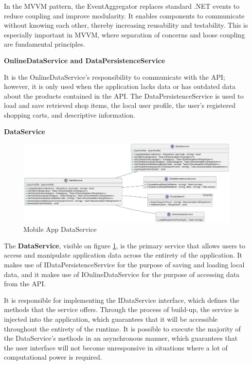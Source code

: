 In the MVVM pattern, the EventAggregator replaces standard .NET events to reduce coupling and improve modularity. It enables components to communicate without knowing each other, thereby increasing reusability and testability. This is especially important in MVVM, where separation of concerns and loose coupling are fundamental principles.

\noindent\textbf{OnlineDataService and DataPersistenceService}

It is the OnlineDataService's responsibility to communicate with the API; however, it is only used when the application lacks data or has outdated data about the products contained in the API. The DataPersistenceService is used to load and save retrieved shop items, the local user profile, the user's registered shopping carts, and descriptive information.

\noindent\textbf{DataService}

\begin{figure}[H]
	\centering
	\includegraphics[width=1\linewidth]{img/app_dataservice.png}
	\caption{Mobile App DataService}
	\label{fig:appdataservice}
\end{figure}

The \textbf{DataService}, visible on figure \ref{fig:appdataservice}, is the primary service that allows users to access and manipulate application data across the entirety of the application. It makes use of IDataPersistenceService for the purpose of saving and loading local data, and it makes use of IOnlineDataService for the purpose of accessing data from the API. 

It is responsible for implementing the IDataService interface, which defines the methods that the service offers. Through the process of build-up, the service is injected into the application, which guarantees that it will be accessible throughout the entirety of the runtime. It is possible to execute the majority of the DataService's methods in an asynchronous manner, which guarantees that the user interface will not become unresponsive in situations where a lot of computational power is required. 

